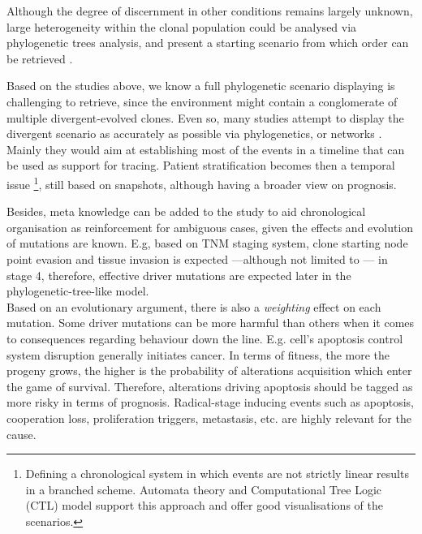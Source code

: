 Although the degree of discernment in other conditions remains largely unknown, large heterogeneity within the clonal population could be analysed via phylogenetic trees analysis, and present a starting scenario from which order can be retrieved \cite{Aguse2019SummarizingTrees} \cite{Turajlic2016MetastasisProcess}.

Based on the studies above, we know a full phylogenetic scenario displaying is challenging to retrieve, since the environment might contain a conglomerate of multiple divergent-evolved clones. Even so, many studies attempt to display the divergent scenario as accurately as possible \cite{Beerenwinkel2005Mtreemix:Trees} \cite{Rahnenfuhrer2005EstimatingScores} via phylogenetics, or networks \cite{Hjelm2006NewOncogenesis} \cite{Gerstung2011TheTumorigenesis}. Mainly they would aim at establishing most of the events in a timeline that can be used as support for tracing. Patient stratification becomes then a temporal issue \footnote{Defining a chronological system in which events are not strictly linear results in a branched scheme. Automata theory and Computational Tree Logic (CTL) model support this approach and offer good visualisations of the scenarios.}, still based on snapshots, although having a broader view on prognosis.

Besides, meta knowledge can be added to the study to aid chronological organisation as reinforcement for ambiguous cases, given the effects and evolution of mutations are known. E.g, based on TNM staging system, clone starting node point evasion and tissue invasion is expected —although not limited to \cite{Turajlic2016MetastasisProcess}— in stage 4, therefore, effective driver mutations are expected later in the phylogenetic-tree-like model.
\\

Based on an evolutionary argument, there is also a \emph{weighting} effect on each mutation. Some driver mutations can be more harmful than others when it comes to consequences regarding behaviour down the line. E.g. cell's apoptosis control system disruption generally initiates cancer. In terms of fitness, the more the progeny grows, the higher is the probability of alterations acquisition which enter the game of survival\cite{Gerstung2011TheTumorigenesis}. Therefore, alterations driving apoptosis should be tagged as more risky in terms of prognosis. Radical-stage inducing events such as apoptosis, cooperation loss, proliferation triggers, metastasis, etc. are highly relevant for the cause.
\\

